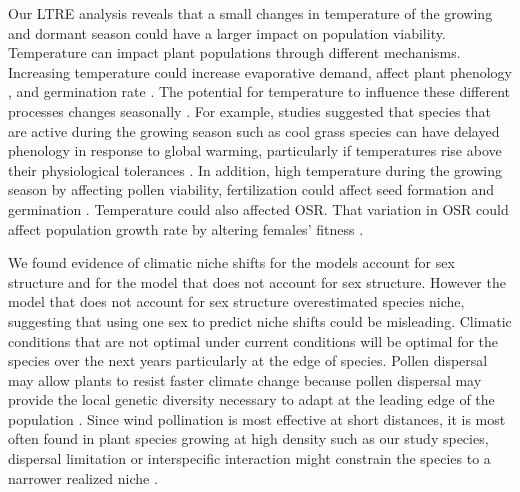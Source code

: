 \documentclass[12pt]{article}
\begin{document}
Our LTRE analysis reveals that a small changes in temperature of the growing and dormant season could have a larger  impact on population viability.
Temperature can impact plant populations through different mechanisms. 
Increasing temperature could increase evaporative demand, affect plant phenology \citep{mclean2016predicting,sherry2007divergence,iler2019reproductive}, and germination rate \citep{reed2021climate}.
The potential for temperature to influence these different processes changes seasonally \citep{konapala2020climate}.
For example, studies suggested that species that are active during the growing season such as cool grass species can have delayed phenology in response to global warming, particularly if temperatures rise above their physiological tolerances \citep{cleland2007shifting,williams2015life}. 
In addition, high temperature during the growing season by affecting pollen viability, fertilization could affect seed formation and germination \citep{hatfield2015temperature,sletvold2015climate}. 
Temperature could also affected OSR. That variation in OSR could affect population growth rate by altering females’ fitness \citep{petry2016sex,knight2005pollen}. 

We found evidence of climatic niche shifts for the models account for sex structure and for the model that does not account for sex structure. 
However the model that does not account for sex structure overestimated species niche, suggesting that using one sex to predict niche shifts could be misleading.
Climatic conditions that are not optimal under current conditions will be optimal for the species over the next years particularly at the edge of species. 
Pollen dispersal may allow plants to resist faster climate change because pollen dispersal may provide the local genetic diversity necessary to adapt at the leading edge of the population \citep{kremer2012long,corlett2013will,duputie2012genetic}.
Since wind pollination is most effective at short distances, it is most often found in plant species growing at high density such as our study species, dispersal limitation or interspecific interaction might constrain the species to a narrower realized niche \citep{pulliam2000relationship,aguilee2016pollen}. 
\end{document}
